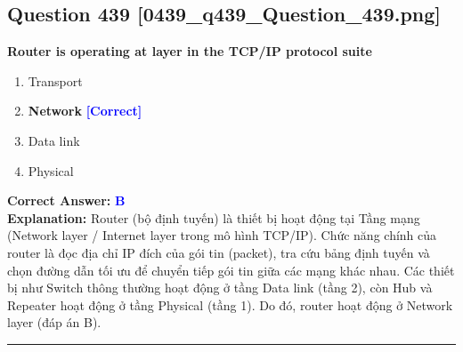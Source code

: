 \documentclass[11pt,a4paper]{article}
\begin{document}
\begin{minipage}{\textwidth}
\subsection*{Question 439 \quad \footnotesize{[0439\_q439\_Question\_439.png]}}
\noindent \textbf{Router is operating at layer in the TCP/IP protocol suite}

\begin{enumerate}[label=\Alph*.]
    \item Transport
    \item \textbf{Network} \hfill \textcolor{blue}{\textbf{[Correct]}}
    \item Data link
    \item Physical
\end{enumerate}

\noindent \textbf{Correct Answer:} \textcolor{blue}{\textbf{B}} \\[2pt]
\noindent \textbf{Explanation:} Router (bộ định tuyến) là thiết bị hoạt động tại Tầng mạng (Network layer / Internet layer trong mô hình TCP/IP). Chức năng chính của router là đọc địa chỉ IP đích của gói tin (packet), tra cứu bảng định tuyến và chọn đường dẫn tối ưu để chuyển tiếp gói tin giữa các mạng khác nhau. Các thiết bị như Switch thông thường hoạt động ở tầng Data link (tầng 2), còn Hub và Repeater hoạt động ở tầng Physical (tầng 1). Do đó, router hoạt động ở Network layer (đáp án B).

\par\vspace{0.3cm}
\hrule
\vspace{0.3cm}
\end{minipage}
\end{document}
